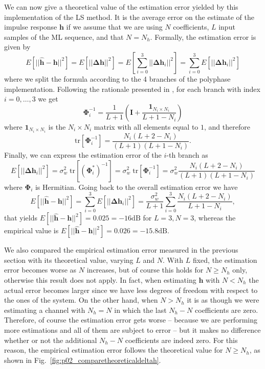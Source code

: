 \documentclass[10pt]{article}
\newcommand{\dB} {\mathrm{dB}}
\newcommand{\tr} {\mathrm{tr}}
\begin{document}
We can now give a theoretical value of the estimation error yielded by this implementation of the LS method. It is the average error on the estimate of the impulse response $\mathbf{h}$ if we assume that we are using $N$ coefficients, $L$ input samples of the ML sequence, and that $N=N_h$. Formally, the estimation error is given by
\begin{equation}
	E[||\mathbf{\hat{h}}-\mathbf{h}||^2] = E[||\mathbf{\Delta h}||^2] = E\left[\sum_{i=0}^{3} ||\mathbf{\Delta h}_i||^2\right] = \sum_{i=0}^{3} E[||\mathbf{\Delta h}_i||^2]
\end{equation}
where we split the formula according to the 4 branches of the polyphase implementation. Following the rationale presented in \cite{bc}, for each branch with index $i=0,\ldots,3$ we get
\begin{equation}
	\mathbf{\Phi}_i^{-1} = \frac{1}{L+1} \left( \mathbf{I} + \frac{\mathbf{1}_{N_i \times N_i}}{L+1-N_i} \right)
\end{equation}
where $\mathbf{1}_{N_i \times N_i}$ is the $N_i \times N_i$ matrix with all elements equal to $1$, and therefore
\begin{equation}
	\tr [\mathbf{\Phi}_i^{-1}] = \frac{N_i(L+2-N_i)}{(L+1)(L+1-N_i)}.
\end{equation}
Finally, we can express the estimation error of the $i$-th branch as
\begin{equation}
	E[||\mathbf{\Delta h}_i||^2] = \sigma_w^2 \; \tr [(\mathbf{\Phi}_i^*)^{-1}] = \sigma_w^2 \; \tr [\mathbf{\Phi}_i^{-1}] = \sigma_w^2 \frac{N_i(L+2-N_i)}{(L+1)(L+1-N_i)}
\end{equation}
where $\mathbf{\Phi}_i$ is Hermitian. Going back to the overall estimation error we have
\begin{equation}\label{eq:deltahtheo}
	E[||\mathbf{\hat{h}}-\mathbf{h}||^2] = \sum_{i=0}^{3} E[||\mathbf{\Delta h}_i||^2] = \frac{\sigma_w^2}{L+1} \sum_{i=0}^{3} \frac{N_i (L+2-N_i)}{L+1-N_i},
\end{equation}
that yields $E[||\mathbf{\hat{h}}-\mathbf{h}||^2] = 0.025 = -16 \dB$ for $L=3, N=3$, whereas the empirical value is $E[||\mathbf{\hat{h}}-\mathbf{h}||^2] = 0.026 = -15.8 \dB$.

We also compared the empirical estimation error measured in the previous section with its theoretical value, varying $L$ and $N$. With $L$ fixed, the estimation error becomes worse as $N$ increases, but of course this holds for $N \geq N_h$ only, otherwise this result does not apply. In fact, when estimating $\mathbf{h}$ with $N<N_h$ the actual error becomes larger since we have less degrees of freedom with respect to the ones of the system. On the other hand, when $N > N_h$ it is as though we were estimating a channel with $N_h = N$ in which the last $N_h - N$ coefficients are zero. Therefore, of course the estimation error gets worse -- because we are performing more estimations and all of them are subject to error -- but it makes no difference whether or not the additional $N_h - N$ coefficients are indeed zero. For this reason, the empirical estimation error follows the theoretical value for $N \geq N_h$, as shown in Fig.~\ref{fig:p02_comparetheoreticaldeltah}.
\end{document}

